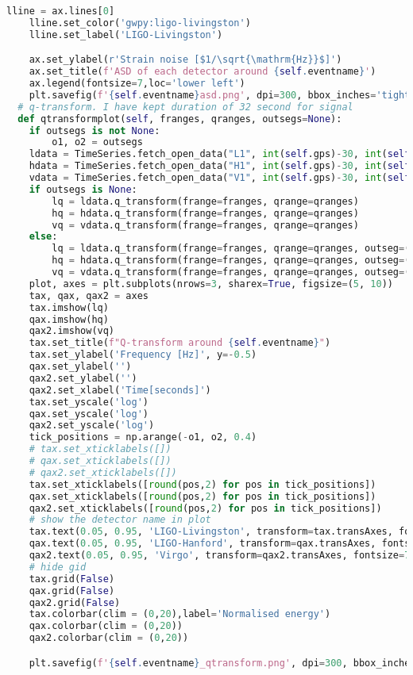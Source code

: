 \begin{lstlisting}[language=Python, caption=Preprocessing Implementation in python]
    lline = ax.lines[0]
    lline.set_color('gwpy:ligo-livingston')  
    lline.set_label('LIGO-Livingston')

    ax.set_ylabel(r'Strain noise [$1/\sqrt{\mathrm{Hz}}$]')
    ax.set_title(f'ASD of each detector around {self.eventname}')
    ax.legend(fontsize=7,loc='lower left')
    plt.savefig(f'{self.eventname}asd.png', dpi=300, bbox_inches='tight')
  # q-transform. I have kept duration of 32 second for signal
  def qtransformplot(self, franges, qranges, outsegs=None):
    if outsegs is not None:
        o1, o2 = outsegs
    ldata = TimeSeries.fetch_open_data("L1", int(self.gps)-30, int(self.gps)+2, cache=True)
    hdata = TimeSeries.fetch_open_data("H1", int(self.gps)-30, int(self.gps)+2, cache=True)
    vdata = TimeSeries.fetch_open_data("V1", int(self.gps)-30, int(self.gps)+2, cache=True)
    if outsegs is None:
        lq = ldata.q_transform(frange=franges, qrange=qranges)
        hq = hdata.q_transform(frange=franges, qrange=qranges)
        vq = vdata.q_transform(frange=franges, qrange=qranges)
    else:
        lq = ldata.q_transform(frange=franges, qrange=qranges, outseg=(self.gps-o1, self.gps+o2))
        hq = hdata.q_transform(frange=franges, qrange=qranges, outseg=(self.gps-o1, self.gps+o2))
        vq = vdata.q_transform(frange=franges, qrange=qranges, outseg=(self.gps-o1, self.gps+o2))
    plot, axes = plt.subplots(nrows=3, sharex=True, figsize=(5, 10))
    tax, qax, qax2 = axes
    tax.imshow(lq)
    qax.imshow(hq)
    qax2.imshow(vq)
    tax.set_title(f"Q-transform around {self.eventname}")
    tax.set_ylabel('Frequency [Hz]', y=-0.5)
    qax.set_ylabel('')
    qax2.set_ylabel('')
    qax2.set_xlabel('Time[seconds]')
    tax.set_yscale('log')
    qax.set_yscale('log')
    qax2.set_yscale('log')
    tick_positions = np.arange(-o1, o2, 0.4)
    # tax.set_xticklabels([])
    # qax.set_xticklabels([])
    # qax2.set_xticklabels([])
    tax.set_xticklabels([round(pos,2) for pos in tick_positions])
    qax.set_xticklabels([round(pos,2) for pos in tick_positions])
    qax2.set_xticklabels([round(pos,2) for pos in tick_positions])
    # show the detector name in plot
    tax.text(0.05, 0.95, 'LIGO-Livingston', transform=tax.transAxes, fontsize=7, verticalalignment='top', color='white')
    qax.text(0.05, 0.95, 'LIGO-Hanford', transform=qax.transAxes, fontsize=7, verticalalignment='top', color='white')
    qax2.text(0.05, 0.95, 'Virgo', transform=qax2.transAxes, fontsize=7, verticalalignment='top', color='white')
    # hide gid
    tax.grid(False)
    qax.grid(False)
    qax2.grid(False)
    tax.colorbar(clim = (0,20),label='Normalised energy')
    qax.colorbar(clim = (0,20))
    qax2.colorbar(clim = (0,20))

    plt.savefig(f'{self.eventname}_qtransform.png', dpi=300, bbox_inches='tight')
    
\end{lstlisting}
\newpage
